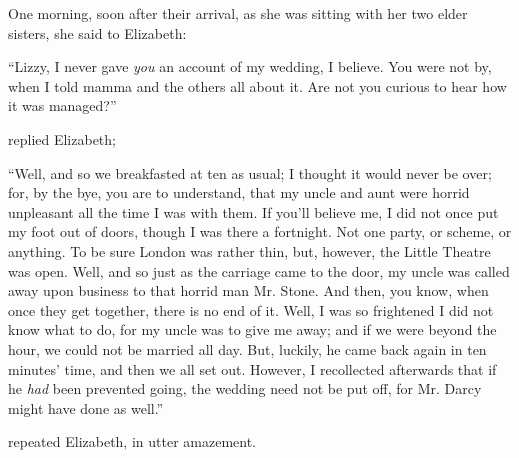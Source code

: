One morning, soon after their arrival, as she was sitting with her two elder sisters, she said to Elizabeth:

“Lizzy, I never gave {\em you} an account of my wedding, I believe. You were not by, when I told mamma and the others all about it. Are not you curious to hear how it was managed?”

 replied Elizabeth; 


“Well, and so we breakfasted at ten as usual; I thought it would never be over; for, by the bye, you are to understand, that my uncle and aunt were horrid unpleasant all the time I was with them. If you'll believe me, I did not once put my foot out of doors, though I was there a fortnight. Not one party, or scheme, or anything. To be sure London was rather thin, but, however, the Little Theatre was open. Well, and so just as the carriage came to the door, my uncle was called away upon business to that horrid man Mr. Stone. And then, you know, when once they get together, there is no end of it. Well, I was so frightened I did not know what to do, for my uncle was to give me away; and if we were beyond the hour, we could not be married all day. But, luckily, he came back again in ten minutes' time, and then we all set out. However, I recollected afterwards that if he {\em had} been prevented going, the wedding need not be put off, for Mr. Darcy might have done as well.”

 repeated Elizabeth, in utter amazement.


